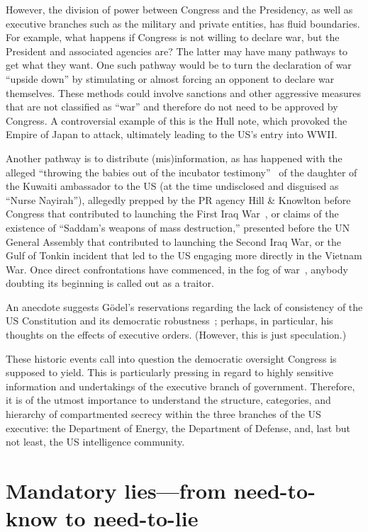 However, the division of power between Congress and the Presidency,
as well as executive branches such as the military and private entities, has fluid boundaries.
For example, what happens if Congress is not willing to declare war, but the President and associated agencies are?
The latter may have many pathways to get what they want.
One such pathway would be to turn the declaration of war ``upside down'' by stimulating or almost forcing an opponent
to declare war themselves.
These methods could involve sanctions and other aggressive measures that are
not classified as ``war'' and therefore do not need to be approved by Congress.
A controversial example of this is the Hull note, which provoked the Empire of Japan to attack,
ultimately leading to the US's entry into WWII.


Another pathway
is to distribute (mis)information, as has happened with the alleged
``throwing the babies out of the incubator testimony''~\cite{guyjohn592010Jun}
of the
daughter of the Kuwaiti ambassador to the US (at the time undisclosed and disguised as ``Nurse Nayirah''),
allegedly prepped by the PR agency Hill \& Knowlton before Congress that contributed
to launching the First Iraq War~\cite{krazyhandz6662011Sep},
or claims of the existence of ``Saddam's weapons of mass destruction,''
presented before the UN General Assembly that contributed to launching the Second Iraq War,
or
the Gulf of Tonkin incident that led to the US engaging more directly in the Vietnam War.
Once direct confrontations have commenced, in the fog of war~\cite{Morris-fog-of-war},
anybody doubting its beginning is called out as a traitor.


An anecdote suggests G\"odel's reservations regarding the lack of consistency of the US Constitution and its democratic robustness~\cite{Morgenstern1971Jan}; perhaps, in particular, his thoughts on the effects of executive orders. (However, this is just speculation.)

These historic events call into question the democratic oversight Congress is supposed to yield. This is particularly pressing in regard to highly sensitive information and undertakings of the executive branch of government. Therefore, it is of the utmost importance to understand the structure, categories, and hierarchy of compartmented secrecy within the three branches of the US executive: the Department of Energy, the Department of Defense, and, last but not least, the US intelligence community.

\section{Mandatory lies---from need-to-know to need-to-lie}
\label{2023-UFO-part-Perception-crash-retreivals-fntktntl}

